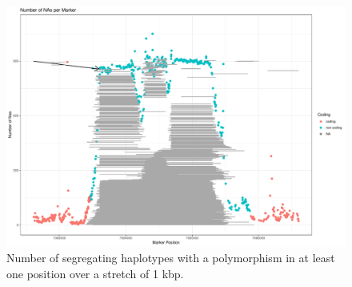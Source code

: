 \begin{figure}[th]
\centering
\includegraphics[height=.55\textheight, width=1.1\textwidth]{Figures/plot_NAs_AT}
\decoRule
\caption[Haplotype structure on a 1kb window of chromosome 4 of
\textit{A. thaliana}]{Number of segregating haplotypes with a polymorphism in at least one
  position over a stretch of 1 kbp.}
\label{fig:chr_jul}
\end{figure}
\cite{dittberner2018natural}
